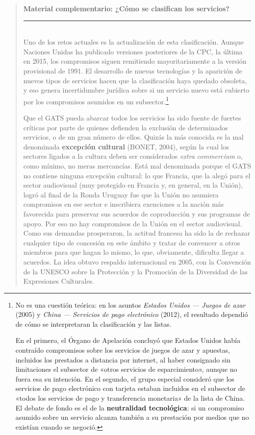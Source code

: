 \documentclass[10pt,a4paper]{article}
\newenvironment{specialblock}[1]{%
      \begin{quote} %
      \small %
      \noindent\textbf{#1}\\[-0.3em] %
      \rule{\linewidth}{0.4pt}\\[0.6em]}{
      \end{quote}}
\begin{document}
\begin{specialblock}{\textbf{Material complementario:} ¿Cómo se clasifican los servicios?}
    Uno de los retos actuales es la actualización de esta clasificación. Aunque Naciones Unidas ha publicado versiones posteriores de la CPC, la última en 2015, los compromisos siguen remitiendo mayoritariamente a la versión provisional de 1991. El desarrollo de nuevas tecnologías y la aparición de nuevos tipos de servicios hacen que la clasificación haya quedado obsoleta, y eso genera incertidumbre jurídica sobre si un servicio nuevo está cubierto por los compromisos asumidos en un subsector.\footnote{%
      No es una cuestión teórica: en los asuntos \textit{Estados Unidos --- Juegos de azar} (2005) y \textit{China --- Servicios de pago electrónico} (2012), el resultado dependió de cómo se interpretaran la clasificación y las listas.

      En el primero, el Órgano de Apelación concluyó que Estados Unidos había contraído compromisos sobre los servicios de juegos de azar y apuestas, incluidos los prestados a distancia por internet, al haber consignado sin limitaciones el subsector de «otros servicios de esparcimiento», aunque no fuera esa su intención. En el segundo, el grupo especial consideró que los servicios de pago electrónico con tarjeta estaban incluidos en el subsector de «todos los servicios de pago y transferencia monetaria» de la lista de China. El debate de fondo es el de la \textbf{neutralidad tecnológica}: si un compromiso asumido sobre un servicio alcanza también a su prestación por medios que no existían cuando se negoció.
    }

    Que el GATS pueda abarcar todos los servicios ha sido fuente de fuertes críticas por parte de quienes defienden la exclusión de determinados servicios, o de un gran número de ellos. Quizás la más conocida es la mal denominada \textbf{excepción cultural} (BONET, 2004), según la cual los sectores ligados a la cultura deben ser considerados \textit{extra commercium} o, como mínimo, no meras mercancías. Está mal denominada porque el GATS no contiene ninguna excepción cultural: lo que Francia, que la alegó para el sector audiovisual (muy protegido en Francia y, en general, en la Unión), logró al final de la Ronda Uruguay fue que la Unión no asumiera compromisos en ese sector e inscribiera exenciones a la nación más favorecida para preservar sus acuerdos de coproducción y sus programas de apoyo. Por eso no hay compromisos de la Unión en el sector audiovisual. Como sus demandas prosperaron, la actitud francesa ha sido la de rechazar cualquier tipo de concesión en este ámbito y tratar de convencer a otros miembros para que hagan lo mismo, lo que, obviamente, dificulta llegar a acuerdos. La idea obtuvo respaldo internacional en 2005, con la Convención de la UNESCO sobre la Protección y la Promoción de la Diversidad de las Expresiones Culturales.
\end{specialblock}
\end{document}
